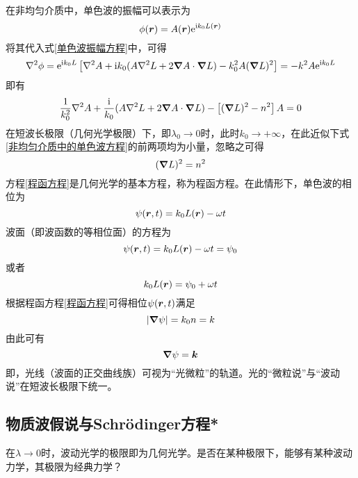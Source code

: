 在非均匀介质中，单色波的振幅可以表示为
\begin{equation*}
	\phi(\boldsymbol{r}) = A(\boldsymbol{r}) \mathrm{e}^{\mathrm{i}k_0 L(\boldsymbol{r})}
\end{equation*}
将其代入式\eqref{单色波振幅方程}中，可得
\begin{equation*}
	\nabla^2 \phi = \mathrm{e}^{\mathrm{i}k_0 L} \left[\nabla^2 A + \mathrm{i} k_0(A\nabla^2 L + 2\boldsymbol{\nabla} A \cdot \boldsymbol{\nabla} L) - k_0^2 A(\boldsymbol{\nabla} L)^2 \right] = -k^2 A \mathrm{e}^{\mathrm{i} k_0 L}
\end{equation*}
即有
\begin{equation}
	\frac{1}{k_0^2} \nabla^2 A + \frac{\mathrm{i}}{k_0} (A\nabla^2 L + 2\boldsymbol{\nabla} A \cdot \boldsymbol{\nabla} L) - \left[(\boldsymbol{\nabla} L)^2 - n^2\right] A = 0
	\label{非均匀介质中的单色波方程}
\end{equation}
在短波长极限（几何光学极限）下，即$\lambda_0 \to 0$时，此时$k_0 \to +\infty$，在此近似下式\eqref{非均匀介质中的单色波方程}的前两项均为小量，忽略之可得
\begin{equation}
	(\boldsymbol{\nabla} L)^2 = n^2
	\label{程函方程}
\end{equation}
方程\eqref{程函方程}是几何光学的基本方程，称为{\heiti 程函方程}。在此情形下，单色波的相位为
\begin{equation*}
	\psi(\boldsymbol{r},t) = k_0 L(\boldsymbol{r}) - \omega t
\end{equation*}
波面（即波函数的等相位面）的方程为
\begin{equation*}
	\psi(\boldsymbol{r},t) = k_0 L(\boldsymbol{r}) - \omega t = \psi_0
\end{equation*}
或者
\begin{equation*}
	k_0 L(\boldsymbol{r}) = \psi_0 + \omega t
\end{equation*}
根据程函方程\eqref{程函方程}可得相位$\psi(\boldsymbol{r},t)$满足
\begin{equation*}
	|\boldsymbol{\nabla} \psi| = k_0 n = k
\end{equation*}
由此可有
\begin{equation*}
	\boldsymbol{\nabla} \psi = \boldsymbol{k}
\end{equation*}
即，光线（波面的正交曲线族）可视为“光微粒”的轨道。光的“微粒说”与“波动说”在短波长极限下统一。

\subsection{物质波假说与Schr\"{o}dinger方程*}

在$\lambda \to 0$时，波动光学的极限即为几何光学。是否在某种极限下，能够有某种波动力学，其极限为经典力学？

